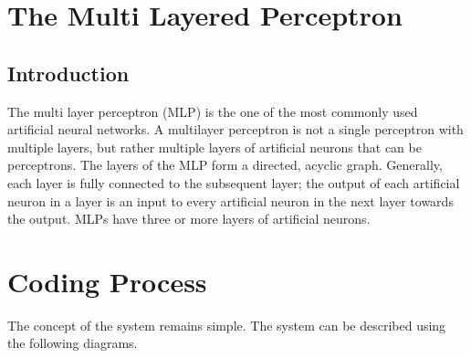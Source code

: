 \documentclass[12pt]{article}
\begin{document}
\newpage
\section{The Multi Layered Perceptron}
\subsection{Introduction}
The multi layer perceptron (MLP) is the one of the most commonly used artificial neural networks. A multilayer perceptron is not a single perceptron with multiple layers, but rather multiple layers of artificial neurons that can be perceptrons. The layers of the MLP form a directed, acyclic graph. Generally, each layer is fully connected to the subsequent layer; the output of each artificial neuron in a layer is an input to every artificial neuron in the next layer towards the output. MLPs have three or more layers of artificial neurons.

\newpage
\section{Coding Process}
The concept of the system remains simple. The system can be described using the following diagrams.
\end{document}
